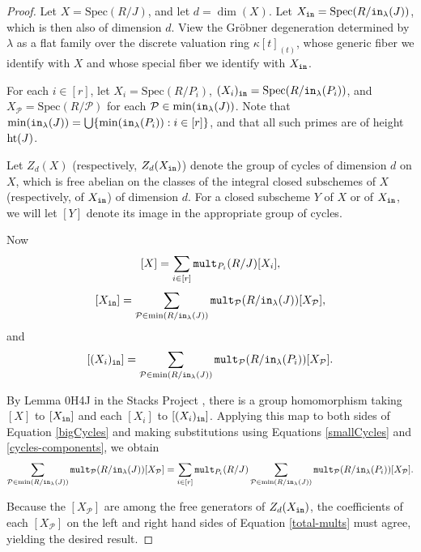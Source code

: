 \documentclass[12pt,reqno]{amsart}
\newtheorem{Main Conjecture}[theorem]{Main Conjecture}
\theoremstyle{remark}
\theoremstyle{plain}
\newcommand{\init}{{\tt in}}
\newcommand{\mult}{{\tt mult}}
\newcommand{\hgt}{{\rm{ht }}}
\newcommand{\spec}{{\mbox{Spec}}}
\begin{document}
\begin{proof}
Let $X = \spec(R/J)$, and let $d = \dim(X)$. Let $X_\init = \spec(R/\init_\lambda(J))$, which is then also of dimension $d$.  View the Gr\"obner degeneration determined by $\lambda$ as a flat family over the discrete valuation ring $\kappa[t]_{(t)}$, whose generic fiber we identify with $X$ and whose special fiber we identify with $X_\init$.  

For each $i \in [r]$, let $X_i = \spec(R/P_i)$, $(X_i)_\init = \spec(R/\init_\lambda(P_i))$, and $X_\mathcal{P} = \spec(R/\mathcal{P})$ for each $\mathcal{P} \in \min(\init_\lambda(J))$.  Note that $\min(\init_\lambda(J)) = \bigcup \{\min(\init_\lambda(P_i)) :i \in [r] \}$, and that all such primes are of height $\hgt(J)$.  

Let $Z_d(X)$ (respectively, $Z_d(X_\init)$) denote the group of cycles of dimension $d$ on $X$, which is free abelian on the classes of the integral closed subschemes of $X$ (respectively, of $X_\init$) of dimension $d$.  For a closed subscheme $Y$ of $X$ or of $X_\init$, we will let $[Y]$ denote its image in the appropriate group of cycles.

Now \begin{equation}\label{bigCycles}
[X] = \sum_{i \in [r]} \mult_{P_i}(R/J) [X_i],
\end{equation}
 \begin{equation}\label{smallCycles}
 [X_\init] = \sum_{\mathcal{P} \in \min(R/\init_\lambda(J))} \mult_{\mathcal{P}}(R/\init_\lambda(J)) [X_\mathcal{P}],
\end{equation}
and \begin{equation}\label{cycles-components}
 [(X_i)_\init] = \sum_{\mathcal{P} \in \min(R/\init_\lambda(J))} \mult_{\mathcal{P}}(R/\init_\lambda(P_i)) [X_\mathcal{P}].
\end{equation}

By Lemma 0H4J in the Stacks Project \cite{stacks-project}, there is a group homomorphism taking $[X]$ to $[X_\init]$ and each $[X_i]$ to $[(X_i)_\init]$.  Applying this map to both sides of Equation \ref{bigCycles} and making substitutions using Equations \ref{smallCycles} and \ref{cycles-components}, we obtain
 \begin{equation}\label{total-mults}
\sum_{\mathcal{P} \in \min(R/\init_\lambda(J))} \mult_{\mathcal{P}}(R/\init_\lambda(J)) [X_\mathcal{P}] = \sum_{i \in [r]} \mult_{P_i}(R/J) \sum_{\mathcal{P} \in \min(R/\init_\lambda(J))} \mult_{\mathcal{P}}(R/\init_\lambda(P_i)) [X_\mathcal{P}].
\end{equation}

Because the $[X_{\mathcal{P}}]$ are among the free generators of $Z_d(X_\init)$, the coefficients of each $[X_\mathcal{P}]$ on the left and right hand sides of Equation \ref{total-mults} must agree, yielding the desired result.
\end{proof}
\end{document}
